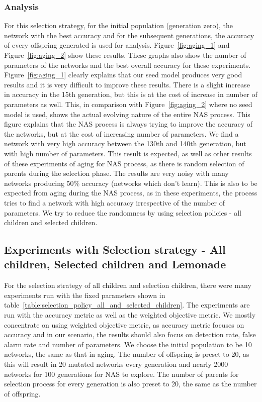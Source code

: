 \subsubsection{Analysis}

For this selection strategy, for the initial population (generation zero), the network with the best accuracy and for the subsequent generations, the accuracy of every offspring generated is used for analysis. Figure~\ref{fig:aging_1} and Figure~\ref{fig:aging_2} show these results. These graphs also show the number of parameters of the networks and the best overall accuracy for these experiments. Figure~\ref{fig:aging_1} clearly explains that our seed model produces very good results and it is very difficult to improve these results. There is a slight increase in accuracy in the 15th generation, but this is at the cost of increase in number of parameters as well. This, in comparison with Figure~\ref{fig:aging_2} where no seed model is used, shows the actual evolving nature of the entire NAS process. This figure explains that the NAS process is always trying to improve the accuracy of the networks, but at the cost of increasing number of parameters. We find a network with very high accuracy between the 130th and 140th generation, but with high number of parameters. This result is expected, as well as other results of these experiments of aging for NAS process, as there is random selection of parents during the selection phase. The results are very noisy with many networks producing 50\% accuracy (networks which don't learn). This is also to be expected from aging during the NAS process, as in these experiments, the process tries to find a network with high accuracy irrespective of the number of parameters. We try to reduce the randomness by using selection policies - all children and selected children.

\subsection{Experiments with Selection strategy - All children, Selected children and Lemonade}

For the selection strategy of all children and selection children, there were many experiments run with the fixed parameters shown in table~\ref{table:selection_policy_all_and_selected_children}. The experiments are run with the accuracy metric as well as the weighted objective metric. We mostly concentrate on using weighted objective metric, as accuracy metric focuses on accuracy and in our scenario, the results should also focus on detection rate, false alarm rate and number of parameters. We choose the initial population to be 10 networks, the same as that in aging. The number of offspring is preset to 20, as this will result in 20 mutated networks every generation and nearly 2000 networks for 100 generations for NAS to explore. The number of parents for selection process for every generation is also preset to 20, the same as the number of offspring.

